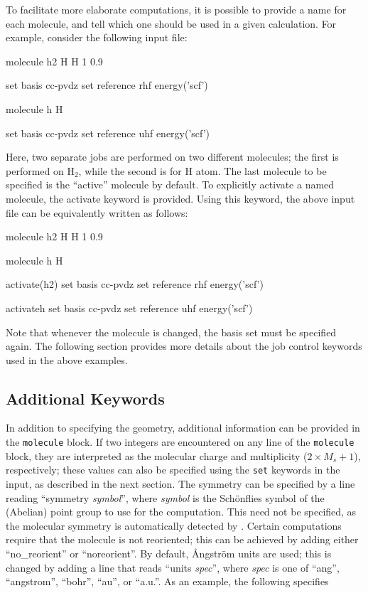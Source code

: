 To facilitate more elaborate computations, it is possible to provide a name for
each molecule, and tell \PSIfour which one should be used in a given
calculation. For example, consider the following input file:
\begin{Snippet}
molecule h2{
  H
  H 1 0.9
}


set basis cc-pvdz
set reference rhf
energy('scf')

molecule h{
  H
}

set basis cc-pvdz
set reference uhf
energy('scf')
\end{Snippet}
Here, two separate jobs are performed on two different molecules; the first is
performed on H$_2$, while the second is for H atom. The last molecule to be
specified is the ``active'' molecule by default. To explicitly activate a named
molecule, the activate keyword is provided. Using this keyword, the above input
file can be equivalently written as follows:
\begin{Snippet}
molecule h2{
  H
  H 1 0.9
}

molecule h{
  H
}

activate(h2)
set basis cc-pvdz
set reference rhf
energy('scf')

activate{h}
set basis cc-pvdz
set reference uhf
energy('scf')
\end{Snippet}
Note that whenever the molecule is changed, the basis set must be specified
again. The following section provides more details about the job control
keywords used in the above examples.

\subsection{Additional Keywords}

In addition to specifying the geometry, additional information can be provided
in the {\tt molecule} block. If two integers are encountered on any line of the
{\tt molecule} block, they are interpreted as the molecular charge and multiplicity
($2\times M_s + 1$), respectively; these values can also be specified using the
{\tt set} keywords in the input, as described in the next section. The symmetry can
be specified by a line reading ``symmetry {\it symbol}'', where {\it symbol} is
the Sch\"onflies symbol of the (Abelian) point group to use for the
computation. This need not be specified, as the molecular symmetry is
automatically detected by \PSIfour.  Certain computations require that the
molecule is not reoriented; this can be achieved by adding either
``no\_reorient'' or ``noreorient''. By default, \AA ngstr\"om units are used;
this is changed by adding a line that reads ``units {\it spec}'', where {\it
spec} is one of ``ang'', ``angstrom'', ``bohr'', ``au'', or ``a.u.''. As an
example, the following specifies

